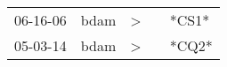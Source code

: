 \begin{supertabular}{lllll}
 06-16-06 &  bdam &  \textgreater &   &  *CS1* \\
 05-03-14 &  bdam &  \textgreater &   &  *CQ2* \\
\end{supertabular}
